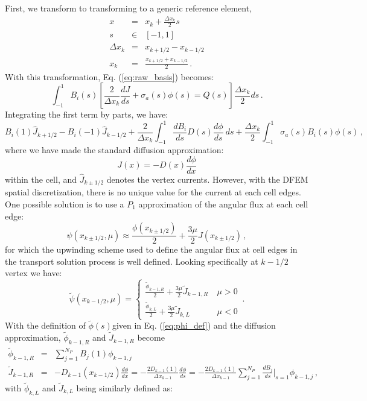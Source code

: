 \documentclass[11pt]{article}
\newcommand{\benum}{\begin{equation}}
\newcommand{\eenum}{\end{equation}}
\newcommand{\be}{\begin{equation*}}
\newcommand{\ee}{\end{equation*}}
\newcommand{\bea}{\begin{eqnarray*}}
\newcommand{\eea}{\end{eqnarray*}}
\newcommand{\beanum}{\begin{eqnarray}}
\newcommand{\eeanum}{\end{eqnarray}}
\newcommand{\eqt}[1]{Eq. (\ref{#1})}
\newcommand{\B}[1]{\ensuremath{{B_{#1} }}}
\newcommand{\p}{\ensuremath{ d}}
\newcommand{\PT}{\ensuremath{\widetilde{\phi}(s) }}
\newcommand{\pec}{\, ,}
\newcommand{\pep}{\, .}
\begin{document}
First, we transform to transforming to a generic reference element,
\bea
x &=& x_k + \frac{\Delta x_k}{2} s \\
s &\in& [-1,1] \\
\Delta x_k &=& x_{k+1/2} - x_{k-1/2} \\
x_k &=& \frac{x_{k+1/2} + x_{k-1/2}}{2} \pep
\eea
With this transformation, \eqt{eq:raw_basis} becomes:
\benum
\int_{-1}^{1}{\B{i}(s) \left[ \frac{2}{\Delta x_k}\frac{\p J}{\p s} + \sigma_a(s)\phi(s) = Q(s)  \right]\frac{\Delta x_k}{2}ds} \pep
\eenum
Integrating the first term by parts, we have:
\benum
\label{eq:diff}
\B{i}(1)\widehat{J}_{k+1/2} - \B{i}(-1)\widehat{J}_{k-1/2} + \frac{2}{\Delta x_k}\int_{-1}^1{\frac{\p \B{i}}{\p s} D(s) \frac{\p \phi}{\p s} ~ds} + \frac{\Delta x_k}{2} \int_{-1}^1{\sigma_a(s) \B{i}(s) \phi(s)} \pec
\eenum
where we have made the standard diffusion approximation:
\be
J(x) = -D(x)\frac{\p \phi}{\p x}
\ee
within the cell, and $\widehat{J}_{k\pm1/2}$ denotes the vertex currents.  However, with the DFEM spatial discretization, there is no unique value for the current at each cell edges.  One possible solution is to use a $P_1$ approximation of the angular flux at each cell edge:
\be
\psi(x_{k\pm1/2},\mu) \approx \frac{\phi(x_{k\pm1/2})}{2} + \frac{3\mu}{2}J(x_{k\pm1/2}) \pec
\ee
for which the upwinding scheme used to define the angular flux at cell edges in the transport solution process is well defined.
Looking specifically at $k-1/2$ vertex we have:
\benum
\widetilde{\psi}(x_{k-1/2},\mu) = \left \{ \begin{array}{ll}
\frac{\widetilde{\phi}_{k-1,R}}{2} + \frac{3\mu}{2}\widetilde{J}_{k-1,R} & ~\mu>0 \\
\frac{\widetilde{\phi}_{k,L}}{2} + \frac{3\mu}{2}\widetilde{J}_{k,L}& ~\mu<0
\end{array}
\right. 
\pep
\label{eq:upwind_psi}
\eenum
With the definition of \PT given in \eqt{eq:phi_def} and the diffusion approximation, $\widetilde{\phi}_{k-1,R}$ and $\widetilde{J}_{k-1,R}$ become
\begin{subequations}
\label{eq:int_1}
\beanum
\widetilde{\phi}_{k-1,R} &=& \sum_{j=1}^{N_P}{ \B{j}(1) \phi_{k-1,j} } \\
\widetilde{J}_{k-1,R} &=& -D_{k-1}(x_{k-1/2}) \frac{\p \phi}{\p x} = -\frac{2D_{k-1}(1)}{\Delta x_{k-1}}\frac{\p \phi}{\p s} = -\frac{2D_{k-1}(1)}{\Delta x_{k-1}} \sum_{j=1}^{N_P}{ \frac{\p \B{j}}{\p s} \bigg \lvert_{s=1} \phi_{k-1,j} } \pec 
\eeanum
\end{subequations}
with $\widetilde{\phi}_{k,L}$ and $\widetilde{J}_{k,L}$ being similarly defined as:
\end{document}
